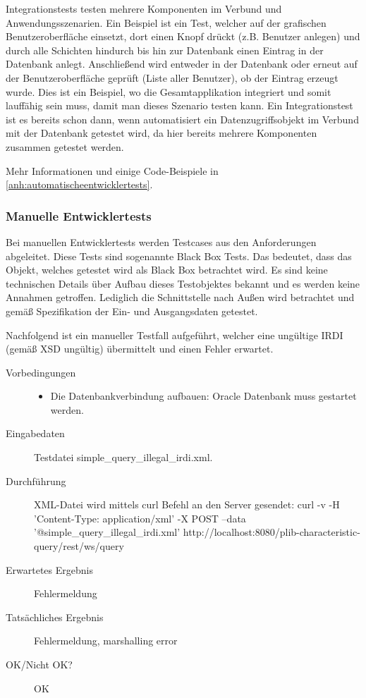 \glspl{Integrationstest} testen mehrere Komponenten im Verbund und Anwendungsszenarien. Ein Beispiel ist ein Test, welcher auf der grafischen Benutzeroberfläche einsetzt, dort einen Knopf drückt (z.B. Benutzer anlegen) und durch alle Schichten hindurch bis hin zur Datenbank einen Eintrag in der Datenbank anlegt. Anschließend wird entweder in der Datenbank oder erneut auf der Benutzeroberfläche geprüft (Liste aller Benutzer), ob der Eintrag erzeugt wurde. 
Dies ist ein Beispiel, wo die Gesamtapplikation integriert und somit lauffähig sein muss, damit man dieses Szenario testen kann. 
Ein Integrationstest ist es bereits schon dann, wenn automatisiert ein Datenzugriffsobjekt im Verbund mit der Datenbank getestet wird, da hier bereits mehrere Komponenten zusammen getestet werden. 

Mehr Informationen und einige Code-Beispiele in \autoref{anh:automatischeentwicklertests}.

\subsubsection{Manuelle Entwicklertests}

Bei manuellen Entwicklertests werden Testcases aus den Anforderungen abgeleitet. Diese Tests sind sogenannte Black Box Tests. Das bedeutet, dass das Objekt, welches getestet wird als Black Box betrachtet wird. Es sind keine technischen Details über Aufbau dieses Testobjektes bekannt und es werden keine Annahmen getroffen. Lediglich die Schnittstelle nach Außen wird betrachtet und gemäß Spezifikation der Ein- und Ausgangsdaten getestet. 

Nachfolgend ist ein manueller Testfall aufgeführt, welcher eine ungültige IRDI (gemäß XSD ungültig) übermittelt und einen Fehler erwartet. 

\begin{description}
\item[Vorbedingungen] 
  \begin{itemize}
   \item Die Datenbankverbindung aufbauen: Oracle Datenbank muss gestartet werden.
  \end{itemize}
\item[Eingabedaten] Testdatei simple\_query\_illegal\_irdi.xml. 
\item[Durchführung]
   XML-Datei wird mittels curl Befehl an den Server gesendet:
   curl -v -H 'Content-Type: application/xml' -X POST --data '@simple\_query\_illegal\_irdi.xml' http://localhost:8080/plib-characteristic-query/rest/ws/query
\item[Erwartetes Ergebnis] Fehlermeldung
\item[Tatsächliches Ergebnis] Fehlermeldung, marshalling error
\item[OK/Nicht OK?] OK
\end{description}

